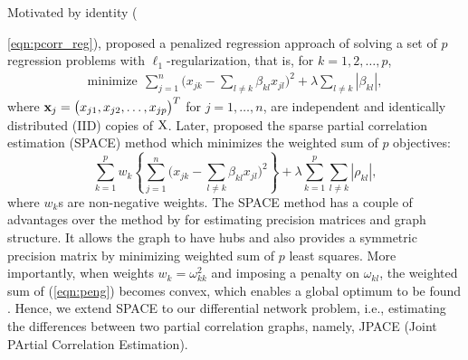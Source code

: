 \documentclass[useAMS,usenatbib,referee]{bio}
\begin{document}
Motivated by identity ({\ref{eqn:pcorr_reg}), \citet{Meinshausen:2006} proposed a penalized regression approach of solving a set of $p$ regression problems with $\ell_1$-regularization, that is, for $k=1,2,\ldots,p$,
\begin{eqnarray*} \label{eqn:regress_mb}
\mbox{minimize} ~~ \sum_{j=1}^n \big( x_{jk} - \sum_{l\neq k}
\beta_{kl} x_{jl}\big)^2  + \lambda \sum_{l \neq k} |\beta_{kl}|,
\end{eqnarray*}
where ${\bf x}_j=\big(x_{j1},x_{j2},\ldots,x_{jp}\big)^T$ for $j=1,\ldots,n$, are independent and identically distributed (IID) copies of ${\rm X}$.
Later, \citet{Peng:2009} proposed the sparse partial correlation estimation (SPACE) method which minimizes the weighted sum of $p$ objectives:
\begin{equation} \label{eqn:peng}
\sum_{k=1}^p w_k \left\{ \sum_{j=1}^n \big( x_{jk} - \sum_{l\neq k}
\beta_{kl}
     x_{jl}\big)^2 \right\} + \lambda \sum_{k=1}^p\sum_{l \neq k} |\rho_{kl}|,
\end{equation}
where $w_k$s are non-negative weights. The SPACE method has a couple of advantages over the method by \citet{Meinshausen:2006} for estimating precision matrices and graph structure. It allows the graph to have hubs and also provides a symmetric precision matrix by minimizing weighted sum of $p$ least squares. 
More importantly, when weights $w_k= \omega^2_{kk}$ and imposing a penalty on $\omega_{kl}$, the weighted sum of (\ref{eqn:peng}) becomes convex, which enables a global optimum to be found \citep{Khare2014}. Hence, we extend SPACE to our differential network problem, i.e., estimating the differences between two partial correlation graphs, namely, JPACE (Joint PArtial Correlation Estimation).

}
\end{document}
